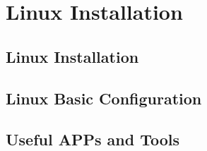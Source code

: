 \chapter{Linux Installation}

\section{Linux Installation}

\section{Linux Basic Configuration}

\section{Useful APPs and Tools}
















